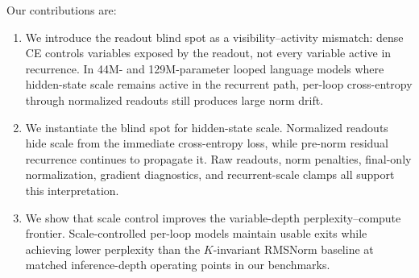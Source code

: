 Our contributions are:
\begin{enumerate}
    \item We introduce the readout blind spot as a visibility--activity mismatch: dense CE controls variables exposed by the readout, not every variable active in recurrence.
    In 44M- and 129M-parameter looped language models where hidden-state scale remains active in the recurrent path, per-loop cross-entropy through normalized readouts still produces large norm drift.
    
    \item We instantiate the blind spot for hidden-state scale. Normalized readouts hide scale from the immediate cross-entropy loss, while pre-norm residual recurrence continues to propagate it. Raw readouts, norm penalties, final-only normalization, gradient diagnostics, and recurrent-scale clamps all support this interpretation.
    
    \item We show that scale control improves the variable-depth perplexity--compute frontier. Scale-controlled per-loop models maintain usable exits while achieving lower perplexity than the $K$-invariant RMSNorm baseline at matched inference-depth operating points in our benchmarks.
\end{enumerate}

